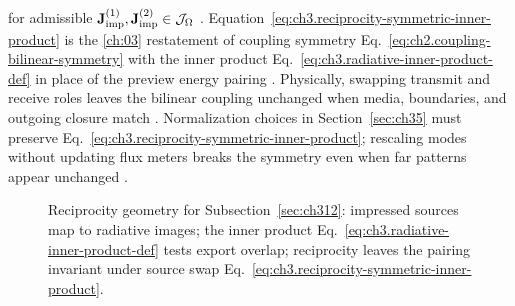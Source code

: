 for admissible \(\mathbf{J}_{\mathrm{imp}}^{(1)},\mathbf{J}_{\mathrm{imp}}^{(2)}\in\mathcal{J}_\Omega\) \cite{stratton1941}.
Equation~\eqref{eq:ch3.reciprocity-symmetric-inner-product} is the \ref{ch:03} restatement of
coupling symmetry Eq.~\eqref{eq:ch2.coupling-bilinear-symmetry} with the inner product
Eq.~\eqref{eq:ch3.radiative-inner-product-def} in place of the preview energy pairing
\cite{stratton1941}. Physically, swapping transmit and receive roles leaves the bilinear coupling unchanged
when media, boundaries, and outgoing closure match \cite{harrington2001}. Normalization choices in
Section~\ref{sec:ch35} must preserve Eq.~\eqref{eq:ch3.reciprocity-symmetric-inner-product}; rescaling modes
without updating flux meters breaks the symmetry even when far patterns appear unchanged
\cite{stratton1941}.
\begin{figure}[t]
\centering
{}
\caption{Reciprocity geometry for Subsection~\ref{sec:ch312}: impressed sources map to radiative images;
the inner product Eq.~\eqref{eq:ch3.radiative-inner-product-def} tests export overlap; reciprocity leaves
the pairing invariant under source swap Eq.~\eqref{eq:ch3.reciprocity-symmetric-inner-product}.}
\label{fig:ch3.reciprocity-inner-product-geometry}
\end{figure}

